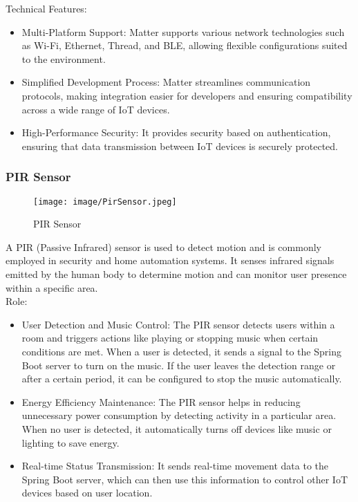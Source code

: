 \documentclass[conference]{IEEEtran}
\begin{document}
Technical Features:
\begin{itemize}
    \item Multi-Platform Support: Matter supports various network technologies such as Wi-Fi, Ethernet, Thread, and BLE, allowing flexible configurations suited to the environment.\\
    \item Simplified Development Process: Matter streamlines communication protocols, making integration easier for developers and ensuring compatibility across a wide range of IoT devices.
    \item High-Performance Security: It provides security based on authentication, ensuring that data transmission between IoT devices is securely protected.\\
\end{itemize}

\subsubsection{PIR Sensor}

\begin{figure}[h!]
    \centering
    \texttt{[image: image/PirSensor.jpeg]}
    \caption{PIR Sensor}
    \label{fig:enter-label}
\end{figure}
\noindent A PIR (Passive Infrared) sensor is used to detect motion and is commonly employed in security and home automation systems. It senses infrared signals emitted by the human body to determine motion and can monitor user presence within a specific area.\\

Role:
\begin{itemize}
    \item User Detection and Music Control: The PIR sensor detects users within a room and triggers actions like playing or stopping music when certain conditions are met. When a user is detected, it sends a signal to the Spring Boot server to turn on the music. If the user leaves the detection range or after a certain period, it can be configured to stop the music automatically.\\
    \item Energy Efficiency Maintenance: The PIR sensor helps in reducing unnecessary power consumption by detecting activity in a particular area. When no user is detected, it automatically turns off devices like music or lighting to save energy.\\
    \item Real-time Status Transmission: It sends real-time movement data to the Spring Boot server, which can then use this information to control other IoT devices based on user location.\\
\end{itemize}
\end{document}
